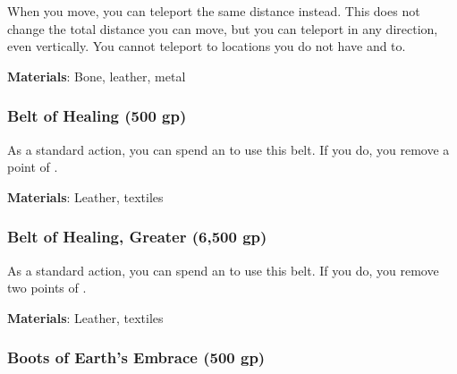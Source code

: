 When you move, you can teleport the same distance instead.
This does not change the total distance you can move, but you can teleport in any direction, even vertically.
You cannot teleport to locations you do not have  and  to.



\vspace{0.25em}
\textbf{Materials}: Bone, leather, metal


\lowercase{\hypertarget{item:Belt of Healing}{}}\label{item:Belt of Healing}
\hypertarget{item:Belt of Healing}{\subsubsection{Belt of Healing\hfill{} (500 gp)}}

As a standard action, you can spend an  to use this belt.
If you do, you remove a point of .



\vspace{0.25em}
\textbf{Materials}: Leather, textiles


\lowercase{\hypertarget{item:Belt of Healing, Greater}{}}\label{item:Belt of Healing, Greater}
\hypertarget{item:Belt of Healing, Greater}{\subsubsection{Belt of Healing, Greater\hfill{} (6,500 gp)}}

As a standard action, you can spend an  to use this belt.
If you do, you remove two points of .



\vspace{0.25em}
\textbf{Materials}: Leather, textiles


\lowercase{\hypertarget{item:Boots of Earth's Embrace}{}}\label{item:Boots of Earth's Embrace}
\hypertarget{item:Boots of Earth's Embrace}{\subsubsection{Boots of Earth's Embrace\hfill{} (500 gp)}}

